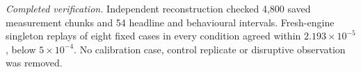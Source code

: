 \noindent\textit{Completed verification.} Independent reconstruction checked 4,800 saved measurement chunks and 54 headline and behavioural intervals. Fresh-engine singleton replays of eight fixed cases in every condition agreed within $2.193\times10^{-5}$, below $5\times10^{-4}$. No calibration case, control replicate or disruptive observation was removed.
